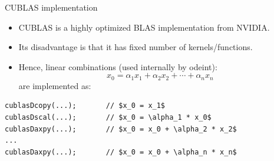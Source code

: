 \documentclass[@BEAMER_OPTIONS@]{beamer}
\begin{document}

\begin{frame}[fragile]{CUBLAS implementation}
    \begin{itemize}
        \item CUBLAS is a highly optimized BLAS implementation from NVIDIA.
        \item Its disadvantage is that it has fixed number of
            kernels/functions.
        \item Hence, linear combinations (used internally by odeint):
            \begin{equation*}
                x_0 = \alpha_1 x_1 + \alpha_2 x_2 + \cdots + \alpha_n x_n
            \end{equation*}
            are implemented as:
    \end{itemize}
    \begin{exampleblock}{}
        \begin{lstlisting}[numbers=none,texcl=true]
cublasDcopy(...);       // $x_0 = x_1$
cublasDscal(...);       // $x_0 = \alpha_1 * x_0$
cublasDaxpy(...);       // $x_0 = x_0 + \alpha_2 * x_2$
...
cublasDaxpy(...);       // $x_0 = x_0 + \alpha_n * x_n$
        \end{lstlisting}
    \end{exampleblock}
\end{frame}

\note{ }
\end{document}
